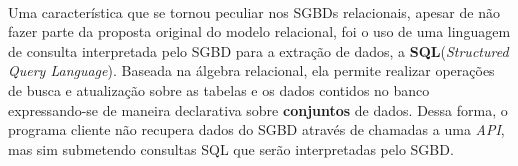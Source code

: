 	\\
	Uma característica que se tornou peculiar nos SGBDs relacionais, apesar de não fazer parte da proposta original do modelo relacional, foi o uso de uma linguagem de consulta interpretada pelo SGBD para a extração de dados, a \textbf{SQL}(\textit{Structured Query Language}). Baseada na álgebra relacional, ela permite realizar operações de busca e atualização sobre as tabelas e os dados contidos no banco expressando-se de maneira declarativa sobre \textbf{conjuntos} de dados. Dessa forma, o programa cliente não recupera dados do SGBD através de chamadas a uma \textit{API}, mas sim submetendo consultas SQL que serão interpretadas pelo SGBD.
\\\\\\\\